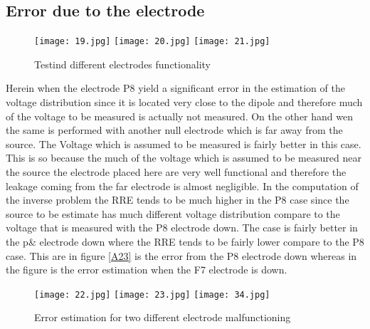 \subsection{Error due to the electrode}
\begin{figure}[!htbp]
%
\centering
\texttt{[image: 19.jpg]}
\endminipage\hfill
{}%
\centering
\texttt{[image: 20.jpg]}
\endminipage\hfill
{}%
\centering
\texttt{[image: 21.jpg]}
\endminipage\hfill
\caption{Testind different electrodes functionality}
\end{figure}

Herein when the electrode P8 yield a significant error in the estimation of the voltage distribution since it is located very close to the dipole and therefore much of the voltage to be measured is actually not measured. On the other hand wen the same is performed with another null electrode which is far away from the source. The Voltage which is assumed to be measured is fairly better in this case. This is so because the much of the voltage which is assumed to be measured near the source the electrode placed here are very well functional and therefore the leakage coming from the far electrode is almost negligible. In the computation of the inverse problem the RRE tends to be much higher in the P8 case since the source to be estimate has much different voltage distribution compare to the voltage that is measured with the P8 electrode down. The case is fairly better in the p& electrode down where the RRE tends to be fairly lower compare to the P8 case. This are in figure \ref{A23} is the error from the P8 electrode  down whereas in the figure \label{A34} is the error estimation when the F7 electrode is down. 

\begin{figure}[!htbp]
%
\centering
\texttt{[image: 22.jpg]}
\subcaption{}
\endminipage\hfill
{}%
\centering
\texttt{[image: 23.jpg]}
\label{A23}
\endminipage\hfill
{}%
\centering
\texttt{[image: 34.jpg]}
\label{34}
\endminipage\hfill
\caption{Error estimation for two different electrode malfunctioning}
\end{figure}

